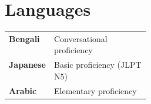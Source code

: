 \section{Languages}

\begin{tabularx}{\linewidth}{@{}p{0.28\linewidth}X@{}}
\textbf{Bengali}  & Conversational proficiency \\
\textbf{Japanese} & Basic proficiency (JLPT N5) \\
\textbf{Arabic}   & Elementary proficiency
\end{tabularx}